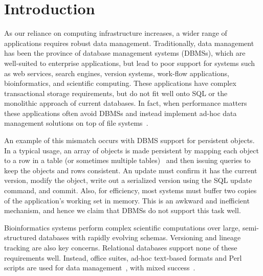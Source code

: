 \documentclass[letterpaper,twocolumn,10pt]{article}
\begin{document}




\section{Introduction}
\label{sec:intro}
As our reliance on computing infrastructure increases, a wider range
of applications requires robust data management.  Traditionally, data
management has been the province of database management systems
(DBMSs), which are well-suited to enterprise applications, but lead to
poor support for systems such as web services, search engines, version
systems, work-flow applications, bioinformatics, and
scientific computing.  These applications have complex transactional
storage requirements, but do not fit well onto SQL or the monolithic
approach of current databases.  In fact, when performance matters
these applications often avoid DBMSs and instead implement ad-hoc data
management solutions on top of file systems~\cite{SNS}.

An example of this mismatch occurs with DBMS support for persistent objects.
In a typical usage, an array of objects is made persistent by mapping
each object to a row in a table (or sometimes multiple
tables)~\cite{hibernate} and then issuing queries to keep the objects
and rows consistent. An update must confirm it has the current
version, modify the object, write out a serialized version using the
SQL update command, and commit.  Also, for efficiency, most systems
must buffer two copies of the application's working set in memory.
This is an awkward and inefficient mechanism, and hence we claim that
DBMSs do not support this task well.

Bioinformatics systems perform complex scientific computations over
large, semi-structured databases with rapidly evolving schemas.
Versioning and lineage tracking are also key concerns.  Relational
databases support none of these requirements well.  Instead, office
suites, ad-hoc text-based formats and Perl scripts are used for data
management~\cite{perl}, with mixed success~\cite{excel}.
\end{document}
